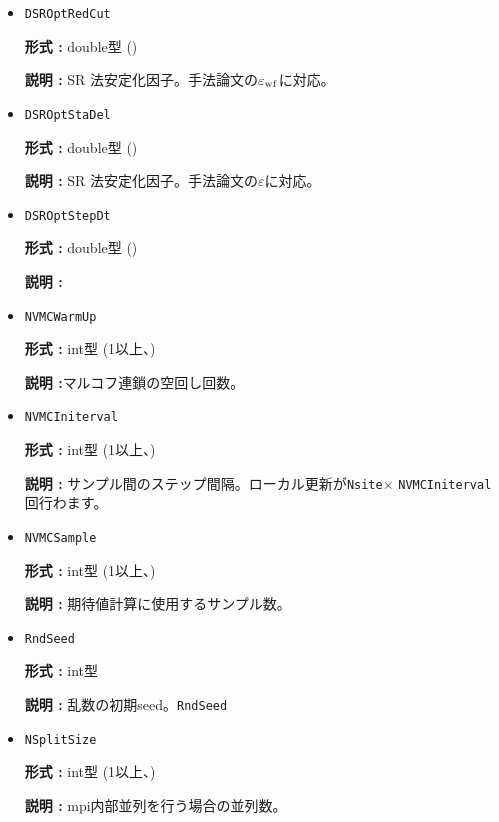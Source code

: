 \begin{itemize}
{\bf 説明 :} \verb|NSROptItrStep|ステップ中、最後の\verb|NSROptItrSmp|ステップでの各変分パラメータの平均値を最適値とする。\verb|NVMCCalMode|=0の場合のみ使用されます。

\item   \verb|DSROptRedCut|
   
{\bf 形式 :} double型 ()

{\bf 説明 :} SR 法安定化因子。手法論文の$\varepsilon_{\rm wf}$に対応。

 \item  \verb|DSROptStaDel| 
   
 {\bf 形式 :} double型 ()

  {\bf 説明 :} SR 法安定化因子。手法論文の$\varepsilon$に対応。
     
\item \verb|DSROptStepDt|

{\bf 形式 :} double型 ()

{\bf 説明 :} 
 
\item \verb|NVMCWarmUp|

{\bf 形式 :} int型 (1以上、)

{\bf 説明 :}マルコフ連鎖の空回し回数。

\item \verb|NVMCIniterval|

{\bf 形式 :} int型 (1以上、)

{\bf 説明 :} サンプル間のステップ間隔。ローカル更新が\verb|Nsite|× \verb|NVMCIniterval| 回行わます。

\item \verb|NVMCSample|

{\bf 形式 :} int型 (1以上、)

{\bf 説明 :} 期待値計算に使用するサンプル数。

\item \verb|RndSeed|

{\bf 形式 :} int型 

{\bf 説明 :} 乱数の初期seed。\verb|RndSeed|

 \item \verb|NSplitSize|

{\bf 形式 :} int型 (1以上、)

{\bf 説明 :} mpi内部並列を行う場合の並列数。


\end{itemize}
